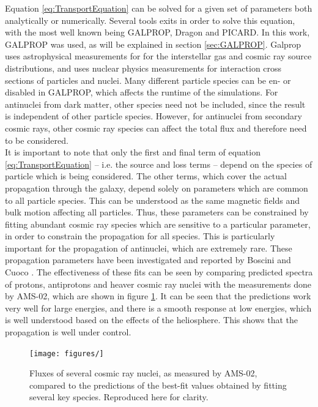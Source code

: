 Equation \ref{eq:TransportEquation} can be solved for a given set of parameters both analytically or numerically. Several tools exits in order to solve this equation, with the most well known being GALPROP\cite{}, Dragon \cite{} and PICARD\cite{}. In this work, GALPROP was used, as will be explained in section \ref{sec:GALPROP}. Galprop uses astrophysical measurements for  for the interstellar gas and cosmic ray source distributions, and uses nuclear physics measurements for interaction cross sections of particles and nuclei. Many different particle species can be en- or disabled in GALPROP, which affects the runtime of the simulations. For antinuclei from dark matter, other species need not be included, since the result is independent of other particle species. However, for antinuclei from secondary cosmic rays, other cosmic ray species can affect the total flux and therefore need to be considered.\\

It is important to note that only the first and final term of equation \ref{eq:TransportEquation} -- i.e. the source and loss terms -- depend on the species of particle which is being considered. The other terms, which cover the actual propagation through the galaxy, depend solely on parameters which are common to all particle species. This can be understood as the same magnetic fields and bulk motion affecting all particles. Thus, these parameters can be constrained by fitting abundant cosmic ray species which are sensitive to a particular parameter, in order to constrain the propagation for all species. This is particularly important for the propagation of antinuclei, which are extremely rare. These propagation parameters have been investigated and reported by Boscini\cite{} and Cuoco \cite{}. The effectiveness of these fits can be seen by comparing predicted spectra of protons, antiprotons and heaver cosmic ray nuclei with the measurements done by AMS-02, which are shown in figure \ref{fig:BosciniFits}. It can be seen that the predictions work very well for large energies, and there is a smooth response at low energies, which is well understood based on the effects of the heliosphere. This shows that the propagation is well under control.\\

\begin{figure}
    \centering
    \texttt{[image: figures/]}
    \caption{Fluxes of several cosmic ray nuclei, as measured by AMS-02, compared to the predictions of the best-fit values obtained by fitting several key species\cite{}. Reproduced here for clarity.}
    \label{fig:BosciniFits}
\end{figure}

